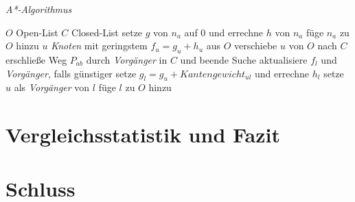 \documentclass[12pt]{article}
\begin{document}
\begin{algorithm}
\caption{\textit{A*-Algorithmus} \label{alg:astar}}
\begin{algorithmic}[1]
\Statex
{}
\Statex
{}
\State \sei $O$ Open-List
\State \sei $C$ Closed-List
\State setze $g$ von $n_a$ auf 0 und errechne $h$ von $n_a$
\State füge $n_a$ zu $O$ hinzu
	\State \sei $u$ \textit{Knoten} mit geringstem $f_u = g_u + h_u$ aus $O$ 
	\State verschiebe $u$ von $O$ nach $C$
		\State erschließe Weg $P_{ab}$ durch \textit{Vorgänger} in $C$ und beende Suche
	\EndIf
			\State aktualisiere $f_l$ und \textit{Vorgänger}, falls günstiger
			\State setze $g_l = g_u + Kantengewicht_{ul}$ und errechne $h_l$
			\State setze $u$ als \textit{Vorgänger} von $l$
			\State füge $l$ zu $O$ hinzu
		\EndIf
	\EndFor
\EndWhile
\EndProcedure
\end{algorithmic}
\end{algorithm}
\newpage

\section{Vergleichsstatistik und Fazit}
\newpage
\section{Schluss}
\newpage
\end{document}
